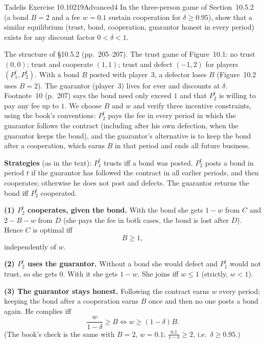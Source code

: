 \begin{exsol}{Tadelis Exercise 10.10}{219}{Advanced}{4}
\asked In the three-person game of Section~10.5.2 (a bond $B = 2$ and a fee $w = 0.1$ sustain cooperation for
$\delta \ge 0.95$), show that a similar equilibrium (trust, bond, cooperation, guarantor honest in every period)
exists for any discount factor $0 < \delta < 1$.

\method The structure of \S10.5.2 (pp.~205--207). The trust game of Figure~10.1: no trust $(0,0)$; trust and
cooperate $(1,1)$; trust and defect $(-1, 2)$ for players $(P_1^t, P_2^t)$. With a bond $B$ posted with player~3,
a defector loses $B$ (Figure~10.2 uses $B = 2$). The guarantor (player~3) lives for ever and discounts at $\delta$.
Footnote~10 (p.~207) says the bond need only exceed $1$ and that $P_2^t$ is willing to pay any fee up to $1$. We choose
$B$ and $w$ and verify three incentive constraints, using the book's conventions: $P_2^t$ pays the fee in every
period in which the guarantor follows the contract (including after his own defection, when the guarantor keeps
the bond), and the guarantor's alternative is to keep the bond after a cooperation, which earns $B$ in that period
and ends all future business.

\solution
\textbf{Strategies} (as in the text): $P_1^t$ trusts iff a bond was posted. $P_2^t$ posts a bond in period $t$ if the
guarantor has followed the contract in all earlier periods, and then cooperates; otherwise he does not post and
defects. The guarantor returns the bond iff $P_2^t$ cooperated.

\textbf{(1) $P_2^t$ cooperates, given the bond.} With the bond she gets $1 - w$ from $C$ and $2 - B - w$ from $D$
(she pays the fee in both cases, the bond is lost after $D$). Hence $C$ is optimal iff
\[
  B \ge 1 ,
\]
independently of $w$.

\textbf{(2) $P_2^t$ uses the guarantor.} Without a bond she would defect and $P_1^t$ would not trust, so she
gets $0$. With it she gets $1 - w$. She joins iff $w \le 1$ (strictly, $w < 1$).

\textbf{(3) The guarantor stays honest.} Following the contract earns $w$ every period; keeping the bond after a
cooperation earns $B$ once and then no one posts a bond again. He complies iff
\[
  \frac{w}{1-\delta} \ge B \iff w \ge (1-\delta)B .
\]
(The book's check is the same with $B = 2$, $w = 0.1$: $\frac{0.1}{1-\delta} \ge 2$, i.e.\ $\delta \ge 0.95$.)


\end{exsol}
